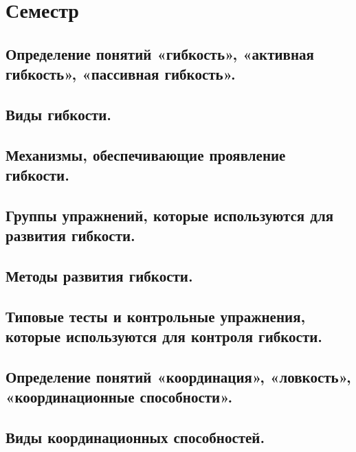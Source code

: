 \section{Семестр}

\subsection{Определение понятий «гибкость», «активная гибкость», «пассивная гибкость».}



\subsection{Виды гибкости.}



\subsection{Механизмы, обеспечивающие проявление гибкости.}



\subsection{Группы упражнений, которые используются для развития гибкости.}



\subsection{Методы развития гибкости.}



\subsection{Типовые тесты и контрольные упражнения, которые используются для контроля гибкости.}



\subsection{Определение понятий «координация», «ловкость», «координационные способности».}



\subsection{Виды координационных способностей.}



